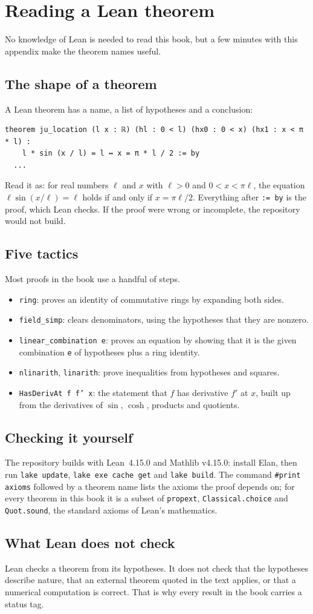 \chapter{Reading a Lean theorem}\label{app:B}

No knowledge of Lean is needed to read this book, but a few minutes with this appendix make the theorem names useful.

\section*{The shape of a theorem}
A Lean theorem has a name, a list of hypotheses and a conclusion:
\begin{leanbox}
\begin{Verbatim}[fontsize=\small]
theorem ju_location (l x : ℝ) (hl : 0 < l) (hx0 : 0 < x) (hx1 : x < π * l) :
    l * sin (x / l) = l ↔ x = π * l / 2 := by
  ...
\end{Verbatim}
\end{leanbox}
\noindent Read it as: for real numbers $\ell$ and $x$ with $\ell>0$ and $0<x<\pi\ell$, the equation $\ell\sin(x/\ell)=\ell$ holds if and only if $x=\pi\ell/2$. Everything after \texttt{:= by} is the proof, which Lean checks. If the proof were wrong or incomplete, the repository would not build.

\section*{Five tactics}
Most proofs in the book use a handful of steps.
\begin{itemize}[leftmargin=*]
\item \texttt{ring}: proves an identity of commutative rings by expanding both sides.
\item \texttt{field\_simp}: clears denominators, using the hypotheses that they are nonzero.
\item \texttt{linear\_combination e}: proves an equation by showing that it is the given combination \texttt{e} of hypotheses plus a ring identity.
\item \texttt{nlinarith}, \texttt{linarith}: prove inequalities from hypotheses and squares.
\item \texttt{HasDerivAt f f' x}: the statement that $f$ has derivative $f'$ at $x$, built up from the derivatives of $\sin$, $\cosh$, products and quotients.
\end{itemize}

\section*{Checking it yourself}
The repository builds with Lean~4.15.0 and Mathlib v4.15.0: install Elan, then run \texttt{lake update}, \texttt{lake exe cache get} and \texttt{lake build}. The command \texttt{\#print axioms} followed by a theorem name lists the axioms the proof depends on; for every theorem in this book it is a subset of \texttt{propext}, \texttt{Classical.choice} and \texttt{Quot.sound}, the standard axioms of Lean's mathematics.

\section*{What Lean does not check}
Lean checks a theorem from its hypotheses. It does not check that the hypotheses describe nature, that an external theorem quoted in the text applies, or that a numerical computation is correct. That is why every result in the book carries a status tag.
